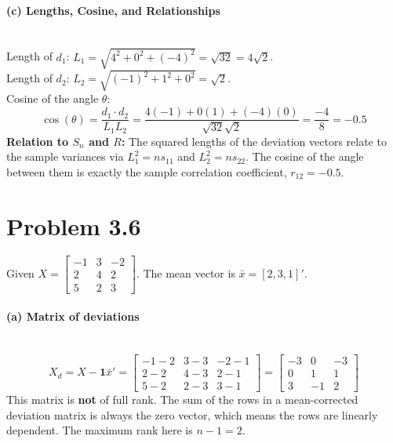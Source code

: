 \documentclass[12pt]{article}
\begin{document}
\paragraph{(c) Lengths, Cosine, and Relationships} \mbox{} \\
Length of $d_1$: $L_1 = \sqrt{4^2 + 0^2 + (-4)^2} = \sqrt{32} = 4\sqrt{2}$.\\
Length of $d_2$: $L_2 = \sqrt{(-1)^2 + 1^2 + 0^2} = \sqrt{2}$.\\
Cosine of the angle $\theta$: 
\[
\cos(\theta) = \frac{d_1 \cdot d_2}{L_1 L_2} = \frac{4(-1) + 0(1) + (-4)(0)}{\sqrt{32}\sqrt{2}} = \frac{-4}{8} = -0.5
\]
\textbf{Relation to $S_n$ and $R$:} The squared lengths of the deviation vectors relate to the sample variances via $L_1^2 = n s_{11}$ and $L_2^2 = n s_{22}$. The cosine of the angle between them is exactly the sample correlation coefficient, $r_{12} = -0.5$.

\section*{Problem 3.6} 
Given $X = \begin{bmatrix} -1 & 3 & -2 \\ 2 & 4 & 2 \\ 5 & 2 & 3 \end{bmatrix}$.
The mean vector is $\bar{x} = [2, 3, 1]'$.

\paragraph{(a) Matrix of deviations} \mbox{} \\
\[
X_d = X - \mathbf{1}\bar{x}' = \begin{bmatrix} -1-2 & 3-3 & -2-1 \\ 2-2 & 4-3 & 2-1 \\ 5-2 & 2-3 & 3-1 \end{bmatrix} = \begin{bmatrix} -3 & 0 & -3 \\ 0 & 1 & 1 \\ 3 & -1 & 2 \end{bmatrix}
\]
This matrix is \textbf{not} of full rank. The sum of the rows in a mean-corrected deviation matrix is always the zero vector, which means the rows are linearly dependent. The maximum rank here is $n-1 = 2$.
\end{document}
